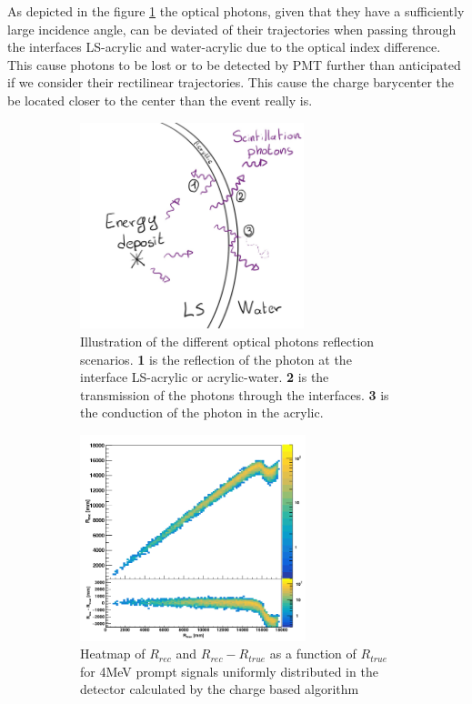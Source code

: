 As depicted in the figure \ref{fig:juno:rec:refl} the optical photons, given that they have a sufficiently large incidence angle, can be deviated of their trajectories when passing through the interfaces LS-acrylic and water-acrylic due to the optical index difference. This cause photons to be lost or to be detected by PMT further than anticipated if we consider their rectilinear trajectories. This cause the charge barycenter the be located closer to the center than the event really is.

\begin{figure}[ht]
  \begin{subfigure}[t]{0.48\textwidth}
    \centering
    \includegraphics[height=6cm]{images/juno/reco/Reflexion_scenarii.jpg}
    \caption{Illustration of the different optical photons reflection scenarios. \textbf{1} is the reflection of the photon at the interface LS-acrylic or acrylic-water. \textbf{2} is the transmission of the photons through the interfaces. \textbf{3} is the conduction of the photon in the acrylic.}
    \label{fig:juno:rec:refl}
  \end{subfigure}
  \hfill
  \begin{subfigure}[t]{0.48\textwidth}
    \centering
    \includegraphics[height=6cm]{images/juno/reco/charge_barycenter.png}
    \caption{Heatmap of $R_{rec}$ and $R_{rec} - R_{true}$ as a function of $R_{true}$ for 4MeV prompt signals uniformly distributed in the detector calculated by the charge based algorithm}
    \label{fig:juno:rec:cbary}
  \end{subfigure}
  \caption{}
\end{figure}

